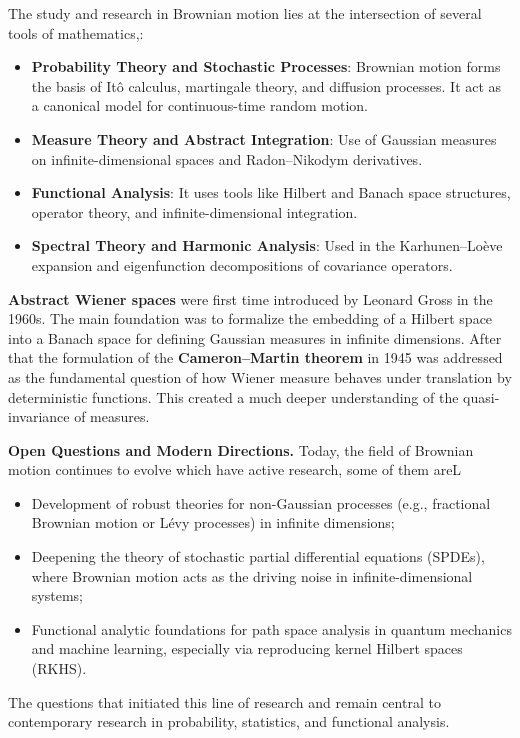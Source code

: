 \documentclass[12pt]{report}
\begin{document}
The study and research in Brownian motion lies at the intersection of several tools of mathematics,:
\begin{itemize}
    \item \textbf{Probability Theory and Stochastic Processes}: Brownian motion forms the basis of Itô calculus, martingale theory, and diffusion processes. It act as a canonical model for continuous-time random motion.
    \item \textbf{Measure Theory and Abstract Integration}: Use of Gaussian measures on infinite-dimensional spaces and Radon–Nikodym derivatives.
    \item \textbf{Functional Analysis}: It uses tools like Hilbert and Banach space structures, operator theory, and infinite-dimensional integration.
    \item \textbf{Spectral Theory and Harmonic Analysis}: Used in the Karhunen–Loève expansion and eigenfunction decompositions of covariance operators.
\end{itemize}

\textbf{Abstract Wiener spaces} were first time introduced by Leonard Gross in the 1960s. The main foundation was to formalize the embedding of a Hilbert space into a Banach space for defining Gaussian measures in infinite dimensions. After that the formulation of the \textbf{Cameron–Martin theorem} in 1945 was addressed as the fundamental question of how Wiener measure behaves under translation by deterministic functions. This created a much deeper understanding of the quasi-invariance of measures. 

\medskip

\noindent\textbf{Open Questions and Modern Directions.} Today, the field of Brownian motion continues to evolve which have active research, some of them areL
\begin{itemize}
    \item Development of robust theories for non-Gaussian processes (e.g., fractional Brownian motion or Lévy processes) in infinite dimensions;
    \item Deepening the theory of stochastic partial differential equations (SPDEs), where Brownian motion acts as the driving noise in infinite-dimensional systems;
    \item Functional analytic foundations for path space analysis in quantum mechanics and machine learning, especially via reproducing kernel Hilbert spaces (RKHS).
\end{itemize}

The questions that initiated this line of research and remain central to contemporary research in probability, statistics, and functional analysis.
\end{document}

